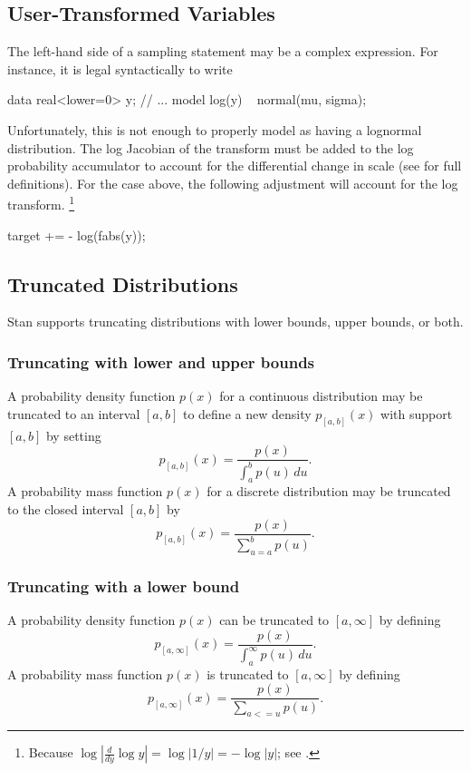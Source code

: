 \subsection{User-Transformed Variables}

The left-hand side of a sampling statement may be a complex
expression.  For instance, it is legal syntactically to write
%
\begin{stancode}
data {
  real<lower=0> y;
}
// ...
model {
  log(y) ~ normal(mu, sigma);
}
\end{stancode}
%
Unfortunately, this is not enough to properly model  as having
a lognormal distribution.  The log Jacobian of the transform must be
added to the log probability accumulator to account for the
differential change in scale (see  for
full definitions).  For the case above, the following adjustment will
account for the log transform.%
%
\footnote{Because $\log | \frac{d}{dy} \log y | = \log | 1/y | = - \log
  |y|$;  see .}
%
\begin{stancode}
target += - log(fabs(y));
\end{stancode}
%

\subsection{Truncated Distributions}

Stan supports truncating distributions with lower bounds, upper
bounds, or both.

\subsubsection{Truncating with lower and upper bounds}

A probability density function $p(x)$ for a continuous distribution
may be truncated to an interval $[a, b]$ to define a new density
$p_{[a, b]}(x)$ with support $[a, b]$ by setting
%
\[
p_{[a, b]}(x)
= \frac{p(x)}
       {\int_a^b p(u) \, du}.
\]
%
A probability mass function $p(x)$ for a discrete distribution may be
truncated to the closed interval $[a, b]$ by
\[
p_{[a, b]}(x) = \frac{p(x)}
                  {\sum_{u = a}^b p(u)}.
\]

\subsubsection{Truncating with a lower bound}

A probability density function $p(x)$ can be truncated to $[a, \infty]$ by
defining
%
\[
p_{[a, \infty]}(x)
= \frac{p(x)}
       {\int_a^{\infty} p(u) \, du}.
\]
%
A probability mass function $p(x)$ is truncated to $[a, \infty]$ by
defining 
%
\[
p_{[a, \infty]}(x) = \frac{p(x)}
                  {\sum_{a <= u} p(u)}.
\]

